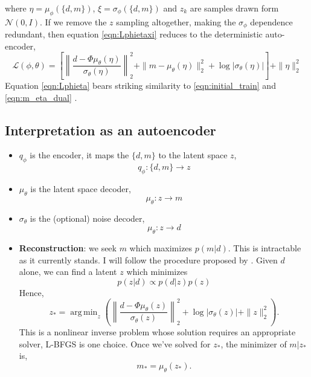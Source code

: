 \documentclass[12pt]{article}
\DeclareMathOperator*{\argmin}{arg\,min}
\begin{document}
where $\eta = \mu_{\phi}(\{d, m\})$, $\xi = \sigma_{\phi}(\{d, m\})$ and $z_k$ are samples drawn form $\mathcal{N}(0,I)$. If we remove the $z$ sampling altogether, making the $\sigma_{\phi}$ dependence redundant, then equation \ref{eqn:Lphietaxi} reduces to the deterministic auto-encoder,
\begin{equation}
\mathcal{L}(\phi, \theta)=\left[\left\|\frac{d-\Phi \mu_{\theta}(\eta)}{\sigma_{\theta}(\eta)}\right\|_2^2 + \|m- \mu_{\theta}(\eta)\|_2^2 + \log{|\sigma_{\theta}(\eta)|}\right]+\|\eta\|_2^2 \label{eqn:Lphieta}
\end{equation}
Equation \ref{eqn:Lphieta} bears striking similarity to \ref{eqn:initial_train} and \ref{eqn:m_eta_dual} .
\subsection{Interpretation as an autoencoder}
\begin{itemize}
\item $q_\phi$ is the encoder, it maps the $\{d,m\}$ to the latent space $z$,
\begin{equation}
q_{\phi}: \{d,m\} \to z
\end{equation} 
\item $\mu_{\theta}$ is the latent space decoder,
\begin{equation}
\mu_{\theta}: z \to m
\end{equation} 
\item $\sigma_{\theta}$ is the (optional) noise decoder,
\begin{equation}
\mu_{\theta}: z \to d
\end{equation} 
\item \textbf{Reconstruction}: we seek $m$ which maximizes $p(m|d)$. This is intractable as it currently stands. I will follow the procedure proposed by \cite{bora}. Given $d$ alone, we can find a latent $z$ which minimizes 
\begin{equation}
p(z|d) \propto p(d|z)p(z)
\end{equation}
Hence,
\begin{equation}
z_{*}=\argmin_z{\left(\left\|\frac{d-\Phi \mu_{\theta}(z)}{\sigma_{\theta}(z)}\right\|_2^2+\log{|\sigma_{\theta}(z)|}+\|z\|_2^2\right)}.\label{eqn:min_z_given_d}
\end{equation} 
This is a nonlinear inverse problem whose solution requires an appropriate solver, L-BFGS is one choice. Once we've solved for $z_{*}$, the minimizer of $m|z_{*}$ is,
\begin{equation}
m_{*}=\mu_{\theta}(z_*).
\end{equation}
\end{itemize}
\end{document}
